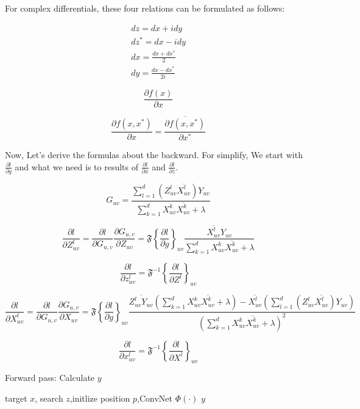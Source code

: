 \documentclass[11pt]{article}
\begin{document}
For complex differentials, these four relations can be formulated as follows:

\begin{eqnarray*}
dz = dx + idy\\
dz^{*} = dx - idy\\
dx = \frac{dx+dx^{*}}{2}\\
dy = \frac{dx-dx^{*}}{2i}
\end{eqnarray*}

$$
\frac{\partial f(x)}{\partial x}
$$

$$
\frac{\partial f(x,x^{*})}{\partial x}=\overline{\frac{\partial f(x,x^{*})}{\partial x^{*}}}
$$
 
Now, Let's derive the formulas about the backward. For simplify, We start with 
 $ \frac{\partial l}{\partial g} $ and what we need is to results of  $ \frac{\partial l}{\partial x} $ and $ \frac{\partial l}{\partial z} $.

$$
G_{uv}=\frac{\sum_{l=1}^{d}(Z_{uv}^{l}\overline{X_{uv}^{l}})Y_{uv}}{\sum_{k=1}^{d}X_{uv}^{k}\overline{X_{uv}^{k}}+\lambda}
$$

$$
\frac{\partial l}{\partial Z_{uv}^{l}}=\frac{\partial l}{\partial G_{u,v}}\frac{\partial G_{u,v}}{\partial Z_{uv}}=\mathfrak{F}\left\{\frac{\partial l}{\partial g}\right\}_{uv}  \frac{\overline{X_{uv}^{l}}Y_{uv}}{\sum_{k=1}^{d}X_{uv}^{k}\overline{X_{uv}^{k}}+\lambda}
$$

$$
\frac{\partial l}{\partial z_{uv}^{l}}
=\mathfrak{F}^{-1} \left\{ \frac{\partial l}{\partial Z^l}\right\}_{uv}
$$

$$
\frac{\partial l}{\partial X_{uv}^{l}}
=\frac{\partial l}{\partial G_{u,v}}\frac{\partial G_{u,v}}{\partial X_{uv}}
=\mathfrak{F}\left\{\frac{\partial l}{\partial g}\right\}_{uv}
\frac{
\overline{Z_{uv}^{l}Y_{uv}}(\sum_{k=1}^{d}X_{uv}^{k}\overline{X_{uv}^{k}}+\lambda)-\overline{X_{uv}^{l}}(\sum_{l=1}^{d}(Z_{uv}^{l}\overline{X_{uv}^{l}})Y_{uv})}
{(\sum_{k=1}^{d}X_{uv}^{k}\overline{X_{uv}^{k}}+\lambda)^{2}}
$$
	
$$
\frac{\partial l}{\partial x_{uv}^{l}}
=\mathfrak{F}^{-1} \left\{ \frac{\partial l}{\partial X^l}\right\}_{uv}
$$


\begin{algorithm}
\caption{Forward pass: Calculate $y$}
\begin{algorithmic} 
\REQUIRE target $x$, search $z$,initlize position $p$,ConvNet $\Phi(\cdot)$
\RETURN $y$

 \ENDFOR
\end{algorithmic}
\end{algorithm}
\end{document}
